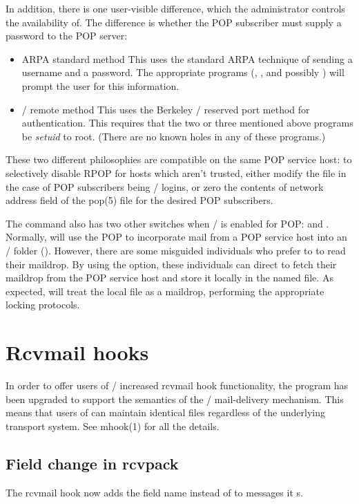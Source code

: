 In addition, there is one user-visible difference,
which the administrator controls the availability of.
The difference is whether the POP subscriber must supply a password to the POP
server:
\begin{itemize}
\item	ARPA standard method\hbreak
This uses the standard ARPA technique of sending a username and a password.
The appropriate programs (, , and possibly )
will prompt the user for this information.

\item	\unix/ remote method\hbreak
This uses the Berkeley \unix/ reserved port method for authentication.
This requires that the two or three mentioned above programs be {\em setuid\/}
to root.
(There are no known holes in any of these programs.)
\end{itemize}
These two different philosophies are compatible on the same POP service host:
to selectively disable RPOP for hosts which aren't trusted,
either modify the  file in the case of POP subscribers being
\unix/ logins,
or zero the contents of network address field of the \man pop(5) file for the
desired POP subscribers.

The  command also has two other switches when \MH/ is enabled for
POP:
 and .
Normally,
 will use the POP to incorporate mail from a POP service host into
an \MH/ folder ().
However,
there are some misguided individuals who prefer to  to read their
maildrop.
By using the  option,
these individuals can direct  to fetch their maildrop from the POP
service host and store it locally in the named file.
As expected,  will treat the local file as a maildrop,
performing the appropriate locking protocols.

\section*	{Rcvmail hooks}
In order to offer users of \MH/ increased rcvmail hook functionality,
the  program has been upgraded to support the semantics of
the \MMDFII/ mail-delivery mechanism.
This means that users of  can maintain identical 
files regardless of the underlying transport system.
See \man mhook(1) for all the details.

\subsection*	{Field change in rcvpack}
The  rcvmail hook now adds the field name 
instead of  to messages it s.


